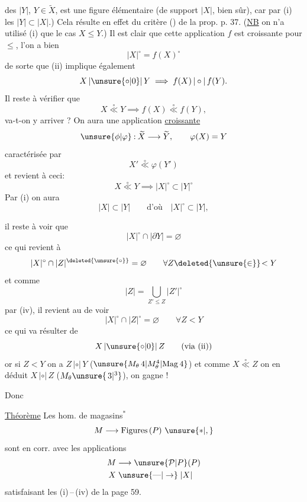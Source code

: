 des $|Y|$, $Y\in\widetilde X$, est une figure élémentaire (de support $|X|$, bien sûr), car par (i) les $|Y|\subset |X|$.) Cela résulte en effet du critère () de la prop. p. 37. (\uline{NB} on n'a utilisé (i) que  le cas $X\leq Y$.) Il est clair que cette application $f$ est croissante pour $\leq$,
  l'on a bien
\[
 |X|^\circ=f(X)^\circ
\]
de sorte que (ii) implique également
\[
 X\,|\unsure{\circ|0}|\,Y\implies f(X)\,|\circ|\,f(Y).
\]
Il reste à vérifier que
\[
 X\mathrel{\overset{\circ}{\ll}}Y\implies f(X)\mathrel{\overset{\circ}{\ll}}f(Y),
\]
 va-t-on y arriver ? On aura une application \uline{croissante}
\[
 \unsure{\phi|\varphi}\mathbin{:}\widetilde X\longrightarrow\widetilde Y,\qquad \varphi(X)=Y
\]
 caractérisée par
\[
 X'\mathrel{\overset{\circ}{\ll}}\varphi(Y')
\]
et  revient à ceci:
\[
 X\mathrel{\overset{\circ}{\ll}}Y\implies |X|^\circ\subset |Y|^\circ
\]
 Par (i) on aura
\[
 |X|\subset |Y|\qquad\text{d'où}\quad |X|^\circ\subset |Y|,
\]

il reste à voir que
\[
 |X|^\circ\cap|\partial Y|=\varnothing
\]
ce qui revient à
\[
 |X|^\circ\cap|Z|^{\deleted{\unsure{\circ}}}=\varnothing\qquad \forall Z\deleted{\unsure{\in}}\!<Y
\]
  et comme
\[
 |Z|=\bigcup_{Z'\leq Z}|Z'|^\circ
\]
par (iv), il revient au  de voir
\[
 |X|^\circ\cap|Z|^\circ=\varnothing\qquad\forall Z<Y
\]
ce qui va résulter de
\[
 X\,|\unsure{\circ|0}|\,Z\qquad\text{(via (ii))}
\]
or si $Z<Y$ on a $Z\,|\circ|\,Y$ ($\unsure{M_\theta\,4|M_\theta^{4}|\mathrm{Mag}\,4}$) et comme $X\mathrel{\overset{\circ}{\ll}}Z$ on en déduit $X\,|\circ|\,Z$ ($M_\theta\unsure{\,3|{}^{3}}$), on gagne !

Donc

\uline{Théorème} Les hom. de magasins$^{*}$
\[
 M\longrightarrow\mathrm{Figures}\,(P)\ \unsure{*|,}
\]
sont en corr.  avec les applications
\[
 \begin{aligned}
 M&\longrightarrow \unsure{\mathcal P|P}(P)\\
 X&\mathrel{\unsure{\text{---}|\to}}|X|
 \end{aligned}
\]
satisfaisant  les   (i)\,--\,(iv) de la page 59.

